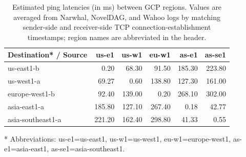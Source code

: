\begin{table}[t]
\centering
\caption{Estimated ping latencies (in ms) between GCP regions. Values are averaged from Narwhal, NovelDAG, and Wahoo logs by matching sender-side and receiver-side TCP connection-establishment timestamps; region names are abbreviated in the header.}
\label{tab:gcp-region-latency}
\small
\begin{tabular}{lrrrrr}
\toprule
Destination* / Source & us-e1 & us-w1 & eu-w1 & as-e1 & as-se1 \\
\midrule
us-east1-b & 0.20 & 68.30 & 91.50 & 185.30 & 223.80 \\
us-west1-a & 69.27 & 0.60 & 138.80 & 127.30 & 161.00 \\
europe-west1-b & 92.40 & 139.00 & 0.20 & 268.10 & 302.00 \\
asia-east1-a & 185.80 & 127.10 & 267.40 & 0.18 & 42.77 \\
asia-southeast1-a & 221.20 & 162.40 & 298.80 & 41.33 & 0.55 \\
\bottomrule
\end{tabular}
\vspace{0.3em}
\footnotesize{* Abbreviations: us-e1=us-east1, us-w1=us-west1, eu-w1=europe-west1, as-e1=asia-east1, as-se1=asia-southeast1.}
\end{table}
